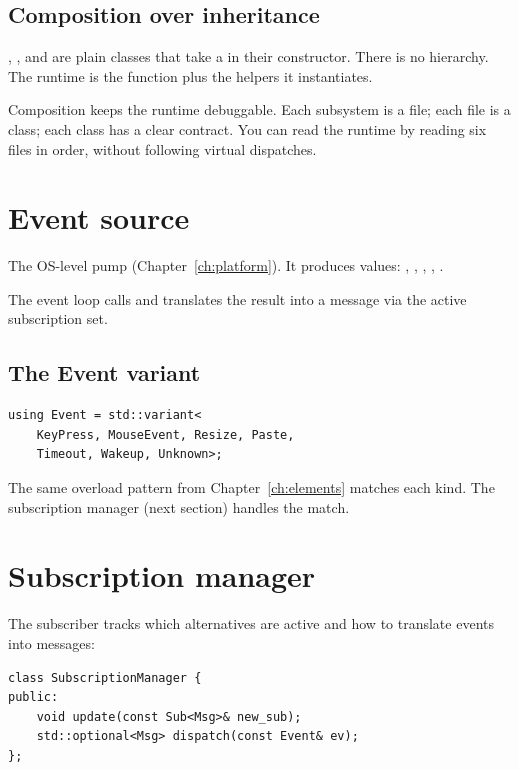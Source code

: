 \subsection*{Composition over inheritance}

, , and  are
plain classes that take a  in their constructor.
There is no  hierarchy. The runtime is the
 function plus the helpers it instantiates.

\begin{idea}
Composition keeps the runtime debuggable. Each subsystem is a
file; each file is a class; each class has a clear contract.
You can read the runtime by reading six files in order, without
following virtual dispatches.
\end{idea}

\section{Event source}

The OS-level pump (Chapter~\ref{ch:platform}). It produces
 values: , ,
, , .

The event loop calls  and translates
the result into a message via the active subscription set.

\subsection*{The Event variant}

\begin{lstlisting}
using Event = std::variant<
    KeyPress, MouseEvent, Resize, Paste,
    Timeout, Wakeup, Unknown>;
\end{lstlisting}

The same overload pattern from Chapter~\ref{ch:elements} matches
each kind. The subscription manager (next section) handles the
match.

\section{Subscription manager}

The subscriber tracks which  alternatives are active
and how to translate events into messages:

\begin{lstlisting}
class SubscriptionManager {
public:
    void update(const Sub<Msg>& new_sub);
    std::optional<Msg> dispatch(const Event& ev);
};
\end{lstlisting}

